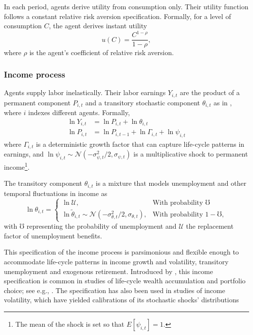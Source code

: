 \documentclass[./RiskyContrib.tex]{subfiles}
\begin{document}
In each period, agents derive utility from consumption only. Their utility function
follows a constant relative risk aversion specification. Formally, for a level of 
consumption $C$, the agent derives instant utility
\begin{equation}
	u(C) = \frac{C^{1-\rho}}{1- \rho},
\end{equation}
where $\rho$ is the agent's coefficient of relative risk aversion.

\subsubsection{Income process}

Agents supply labor inelastically. Their labor earnings $Y_{i,t}$ are the product of a
permanent component $P_{i,t}$ and a transitory stochastic component $\theta_{i,t}$ as
in \cite{Carroll1997qje},  where $i$ indexes different agents. Formally,
\begin{equation*}
\begin{split}
\ln Y_{i,t} &= \ln P_{i,t} + \ln \theta_{i,t} \\
\ln P_{i,t} &= \ln P_{i,t-1} + \ln \Gamma_{i,t} + \ln \psi_{i,t}
\end{split}
\end{equation*}
where $\Gamma_{i,t}$ is a deterministic growth factor that can capture
life-cycle patterns in earnings, and
$\ln \psi_{i,t}\sim \mathcal{N}(-\sigma^2_{\psi,t}/2, \sigma_{\psi,t})$
is a multiplicative shock to permanent income\footnote{The mean of the shock is set so that $E[\psi_{i,t}] = 1$.}.

The transitory component $\theta_{i,t}$ is a mixture that models unemployment and
other temporal fluctuations in income as
\begin{equation*}
\ln\theta_{i,t} = \begin{cases}
\ln \mathcal{U}, & \text{With probability } \mho\\
\ln \tilde{\theta}_{i,t}\sim\mathcal{N}(-\sigma^2_{\theta,t}/2, \sigma_{\theta,t}), & \text{With probability } 1-\mho,
\end{cases}
\end{equation*}
with $\mho$ representing the probability of unemployment and $\mathcal{U}$ the replacement
factor of unemployment benefits.

This specification of the income process is parsimonious and flexible enough to accommodate
life-cycle patterns in income growth and volatility, transitory unemployment and exogenous
retirement. Introduced by \cite{Carroll1997qje}, this income specification is common in studies
of life-cycle wealth accumulation and portfolio choice; see e.g.,
\cite{Cagetti2003jbes,Cocco2005rfs,Fagereng2017jof}. The specification has
also been used in studies of income volatility, which have yielded calibrations of its stochastic
shocks' distributions \citep[see e.g.,][]{Carroll1992bpea,Carroll1997jme,Sabelhaus2010jme}
\end{document}
